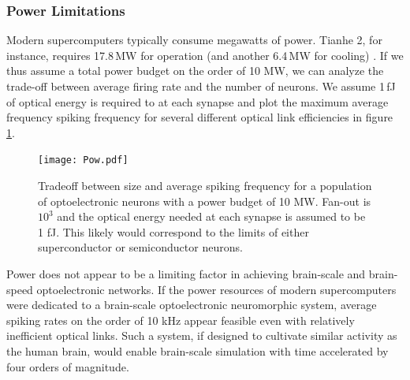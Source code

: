 \documentclass[twocolumn]{article}
\begin{document}
\subsubsection{Power Limitations}
Modern supercomputers typically consume megawatts of power. Tianhe 2, for instance, requires 17.8\,MW for operation (and another 6.4\,MW for cooling) \cite{tolpygo2016superconductor}. If we thus assume a total power budget on the order of 10 MW, we can analyze the trade-off between average firing rate and the number of neurons. We assume 1\,fJ of optical energy is required to at each synapse and plot the maximum average frequency spiking frequency for several different optical link efficiencies in figure \ref{fig:freq_size}.

\begin{figure}[H]
    \centering
    \texttt{[image: Pow.pdf]}
    \caption{Tradeoff between size and average spiking frequency for a population of optoelectronic neurons with a power budget of 10 MW. Fan-out is $10^3$ and the optical energy needed at each synapse is assumed to be 1 fJ. This likely would correspond to the limits of either superconductor or semiconductor neurons.}
    \label{fig:freq_size}
\end{figure}

Power does not appear to be a limiting factor in achieving brain-scale and brain-speed optoelectronic networks. If the power resources of modern supercomputers were dedicated to a brain-scale optoelectronic neuromorphic system, average spiking rates on the order of 10 kHz appear feasible even with relatively inefficient optical links. Such a system, if designed to cultivate similar activity as the human brain, would enable brain-scale simulation with time accelerated by four orders of magnitude.
\end{document}
